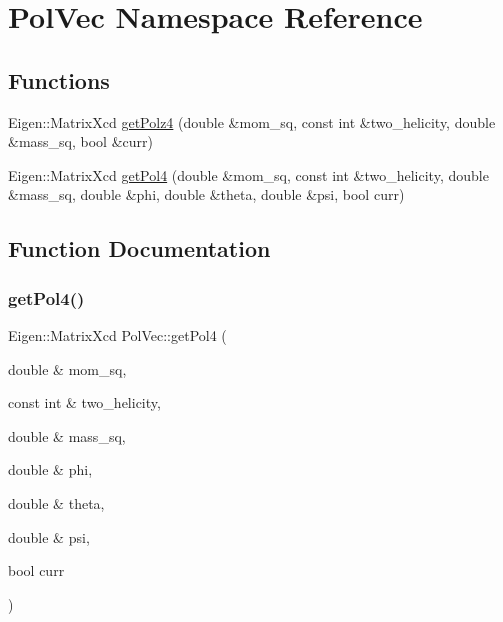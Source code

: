 \hypertarget{namespacePolVec}{}\section{Pol\+Vec Namespace Reference}
\label{namespacePolVec}
\subsection*{Functions}
\begin{DoxyCompactItemize}
\item 
Eigen\+::\+Matrix\+Xcd \mbox{\hyperlink{namespacePolVec_a447669c50a18d92dc7fc6b530588dc85}{get\+Polz4}} (double \&mom\+\_\+sq, const int \&two\+\_\+helicity, double \&mass\+\_\+sq, bool \&curr)
\item 
Eigen\+::\+Matrix\+Xcd \mbox{\hyperlink{namespacePolVec_ade32426820c06c6df537464fc4ae9475}{get\+Pol4}} (double \&mom\+\_\+sq, const int \&two\+\_\+helicity, double \&mass\+\_\+sq, double \&phi, double \&theta, double \&psi, bool curr)
\end{DoxyCompactItemize}


\subsection{Function Documentation}
\mbox{\label{namespacePolVec_ade32426820c06c6df537464fc4ae9475}} 
\subsubsection{\texorpdfstring{getPol4()}{getPol4()}}
{\footnotesize\ttfamily Eigen\+::\+Matrix\+Xcd Pol\+Vec\+::get\+Pol4 (\begin{DoxyParamCaption}\item[{double \&}]{mom\+\_\+sq,  }\item[{const int \&}]{two\+\_\+helicity,  }\item[{double \&}]{mass\+\_\+sq,  }\item[{double \&}]{phi,  }\item[{double \&}]{theta,  }\item[{double \&}]{psi,  }\item[{bool}]{curr }\end{DoxyParamCaption})}

